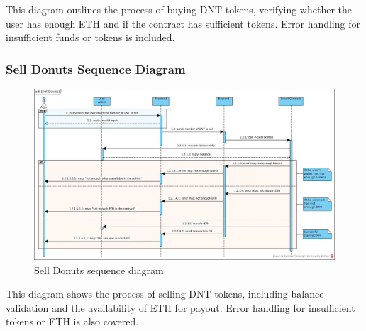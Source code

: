 \documentclass[../main.tex]{subfiles}
\begin{document}
This diagram outlines the process of buying DNT tokens, verifying whether the user has enough ETH and if the contract has sufficient tokens. Error handling for insufficient funds or tokens is included.


\subsubsection{Sell Donuts Sequence Diagram}

\begin{figure}[H]
    \centering
    \includegraphics[width=\linewidth]{../src/diagrams/Sell Donuts.jpg}
    \caption{Sell Donuts sequence diagram}
    \label{fig:sellDNT_seqDiag}
\end{figure}

This diagram shows the process of selling DNT tokens, including balance validation and the availability of ETH for payout. Error handling for insufficient tokens or ETH is also covered.
\end{document}
